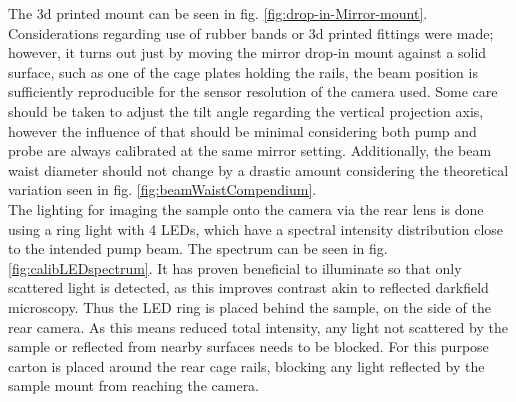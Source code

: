 \documentclass[twoside,openright,listof=numbered]{scrreprt}
\begin{document}
The 3d printed mount can be seen in fig. \ref{fig:drop-in-Mirror-mount}.
Considerations regarding use of rubber bands or 3d printed fittings were made; however, it turns out just by moving the mirror drop-in mount against a solid surface, such as one of the cage plates holding the rails, the beam position is sufficiently reproducible for the sensor resolution of the camera used. Some care should be taken to adjust the tilt angle regarding the vertical projection axis, however the influence of that should be minimal considering both pump and probe are always calibrated at the same mirror setting. Additionally, the beam waist diameter should not change by a drastic amount considering the theoretical variation seen in fig. \ref{fig:beamWaistCompendium}.\\

The lighting for imaging the sample onto the camera via the rear lens is done using a ring light with 4 LEDs, which have a spectral intensity distribution close to the intended pump beam. The spectrum can be seen in fig. \ref{fig:calibLEDspectrum}.
It has proven beneficial to illuminate so that only scattered light is detected, as this improves contrast akin to reflected darkfield microscopy.\cite{Zeiss} Thus the LED ring is placed behind the sample, on the side of the rear camera. As this means reduced total intensity, any light not scattered by the sample or reflected from nearby surfaces needs to be blocked. For this purpose carton is placed around the rear cage rails, blocking any light reflected by the sample mount from reaching the camera.
\end{document}
